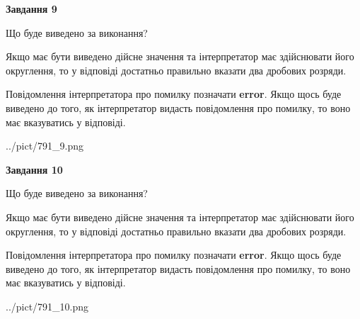 \documentclass[12pt, ukrainian]{article}
\begin{document}
{\begin {Large}
{\begin {center}\textbf{Завдання 9}\end {center}}\par
Що буде виведено за виконання? \par

Якщо має бути виведено дійсне значення та інтерпретатор має здійснювати його округлення, 
то у відповіді достатньо правильно вказати два дробових розряди.

Повідомлення інтерпретатора про помилку позначати \textbf{error}.
Якщо щось буде виведено до того, як інтерпретатор видасть повідомлення про помилку, 
то воно має вказуватись у відповіді. \par

\begin{center}
	{../pict/791_9.png}
\end{center}
\newpage

{\begin {center}\textbf{Завдання 10}\end {center}}\par
Що буде виведено за виконання? \par

Якщо має бути виведено дійсне значення та інтерпретатор має здійснювати його округлення, 
то у відповіді достатньо правильно вказати два дробових розряди.

Повідомлення інтерпретатора про помилку позначати \textbf{error}.
Якщо щось буде виведено до того, як інтерпретатор видасть повідомлення про помилку, 
то воно має вказуватись у відповіді. \par

\begin{center}
	{../pict/791_10.png}
\end{center}
\newpage

\end {Large}}
\end{document}
